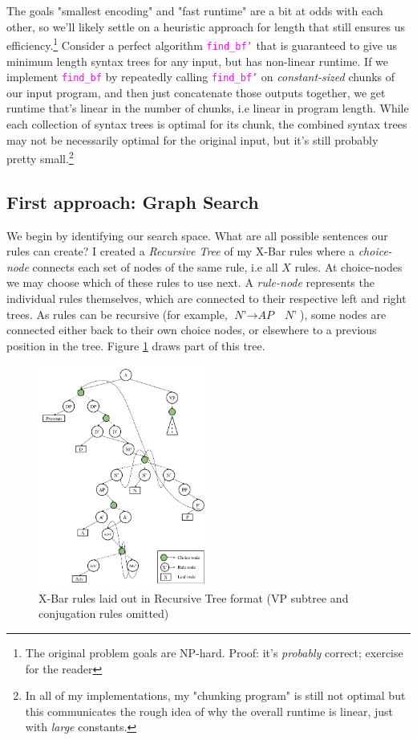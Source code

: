 \documentclass[runningheads]{llncs}
\newcommand{\code}[1]{\texttt{\textcolor{magenta}{\setlength{\fboxsep}{1pt}\colorbox{lightgray!20}{#1}}}}
\begin{document}
The goals "smallest encoding" and "fast runtime" are a bit at odds with each other, so we'll likely settle on a heuristic approach for length that still ensures us efficiency.\footnote{The original problem goals are  NP-hard. Proof: it's \textit{probably} correct; exercise for the reader} Consider a perfect algorithm \code{find\_bf'} that is guaranteed to give us minimum length syntax trees for any input, but has non-linear runtime. If we implement \code{find\_bf} by repeatedly calling \code{find\_bf'} on \textit{constant-sized} chunks of our input program, and then just concatenate those outputs together, we get runtime that's linear in the number of chunks, i.e linear in program length. While each collection of syntax trees is optimal for its chunk, the combined syntax trees may not be necessarily optimal for the original input, but it's still probably pretty small.\footnote{In all of my implementations, my "chunking program" is still not optimal but this communicates the rough idea of why the overall runtime is linear, just with \textit{large} constants.}

\subsection{First approach: Graph Search}
We begin by identifying our search space. What are all possible sentences our rules can create? I created a \textit{Recursive Tree} of my X-Bar rules where a \textit{choice-node} connects each set of nodes of the same rule, i.e all $X$ rules. At choice-nodes we may choose which of these rules to use next. A \textit{rule-node} represents the individual rules themselves, which are connected to their respective left and right trees. As rules can be recursive (for example, $\textit{N'} \rightarrow \textit{AP} \quad \textit{N'}$), some nodes are connected either back to their own choice nodes, or elsewhere to a previous position in the tree. Figure \ref{fig:rule-tree} draws part of this tree.

\begin{figure}
  \centering
  \includegraphics[width=0.5\textwidth]{X-Bar Rule Tree}
	\caption{X-Bar rules laid out in Recursive Tree format (VP subtree and conjugation rules omitted)}
  \label{fig:rule-tree}
\end{figure}
\end{document}
